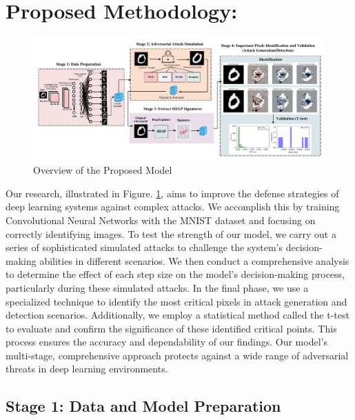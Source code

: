 \documentclass[10pt, conference, a4paper, final]{IEEEtran}
\begin{document}
\section{Proposed Methodology:}

\begin{figure}[!ht]
    \centering
    \includegraphics[width=1\textwidth]{paper_images/model.pdf}
    \caption{Overview of the Proposed Model}
    \label{overview}
\end{figure}
   
Our research, illustrated in Figure. \ref{overview}, aims to improve the defense strategies of deep learning systems against complex attacks. We accomplish this by training Convolutional Neural Networks with the MNIST dataset and focusing on correctly identifying images. To test the strength of our model, we carry out a series of sophisticated simulated attacks to challenge the system's decision-making abilities in different scenarios. We then conduct a comprehensive analysis to determine the effect of each step size on the model's decision-making process, particularly during these simulated attacks. In the final phase, we use a specialized technique to identify the most critical pixels in attack generation and detection scenarios. Additionally, we employ a statistical method called the t-test to evaluate and confirm the significance of these identified critical points. This process ensures the accuracy and dependability of our findings. Our model's multi-stage, comprehensive approach protects against a wide range of adversarial threats in deep learning environments.


\subsection{Stage 1: Data and Model Preparation}
\end{document}

